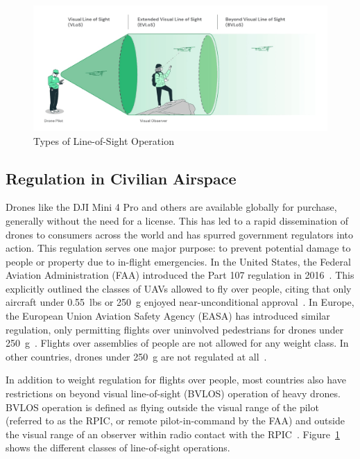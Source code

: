\begin{figure}
    \centering
    \includegraphics[width=1.0\linewidth]{chapter2/FIGS/bvlos.jpg}
    \caption{Types of Line-of-Sight Operation}
    \label{fig:bvlos}
\end{figure}

\subsection{Regulation in Civilian Airspace}
Drones like the DJI Mini 4 Pro and others are available globally for purchase, generally without the need for a license. This has led to a rapid dissemination of drones to consumers across the world and has spurred government regulators into action. This regulation serves one major purpose: to prevent potential damage to people or property due to in-flight emergencies. In the United States, the Federal Aviation Administration (FAA) introduced the Part 107 regulation in 2016~\cite{Flexairco}. This explicitly outlined the classes of UAVs allowed to fly over people, citing that only aircraft under 0.55~lbs or 250~g enjoyed near-unconditional approval~\cite{FAA2021}. In Europe, the European Union Aviation Safety Agency (EASA) has introduced similar regulation, only permitting flights over uninvolved pedestrians for drones under 250~g~\cite{EASA}. Flights over assemblies of people are not allowed for any weight class. In other countries, drones under 250~g are not regulated at all~\cite{IndiaRegulation,ChinaRegulation}.

In addition to weight regulation for flights over people, most countries also have restrictions on beyond visual line-of-sight (BVLOS) operation of heavy drones. BVLOS operation is defined as flying outside the visual range of the pilot (referred to as the RPIC, or remote pilot-in-command by the FAA) and outside the visual range of an observer within radio contact with the RPIC~\cite{BVLOS}. Figure~\ref{fig:bvlos} shows the different classes of line-of-sight operations.

